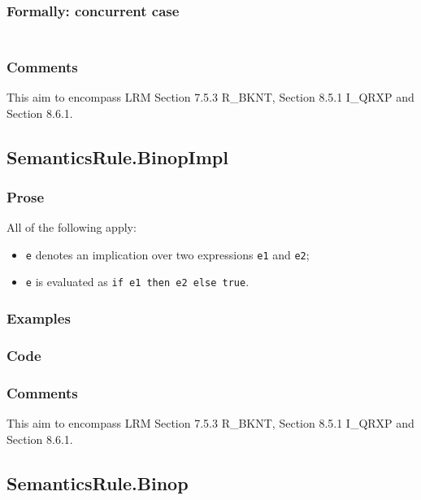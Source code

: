 \documentclass{book}
\begin{document}
  \subsubsection{Formally: concurrent case}
  \begin{align}
  \end{align} 

  \subsubsection{Comments}
  This aim to encompass LRM Section 7.5.3 R\_BKNT, Section 8.5.1 I\_QRXP and Section
  8.6.1.

\subsection{SemanticsRule.BinopImpl \label{sec:SemanticsRule.BinopImpl}}

  \subsubsection{Prose}
  All of the following apply:
  \begin{itemize}
  \item \texttt{e} denotes an implication over two expressions \texttt{e1} and \texttt{e2};
  \item \texttt{e} is evaluated as \texttt{if e1 then e2 else true}.
  \end{itemize}

  \subsubsection{Examples}

  \subsubsection{Code}

  \subsubsection{Comments}
  This aim to encompass LRM Section 7.5.3 R\_BKNT, Section 8.5.1 I\_QRXP and Section
  8.6.1.

\subsection{SemanticsRule.Binop \label{sec:SemanticsRule.Binop}}
\end{document}

